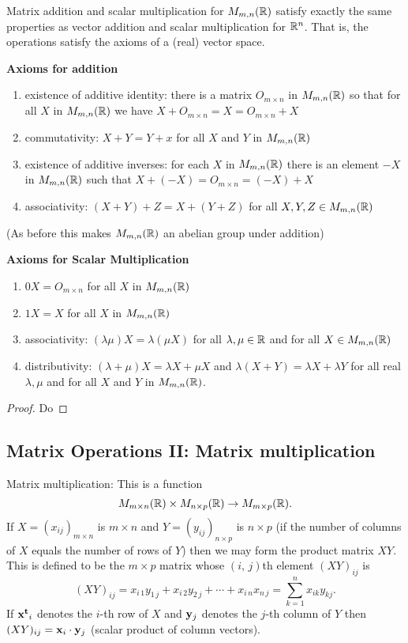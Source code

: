 \documentclass[10pt, a4paper]{article}
\begin{document}
\begin{proposition}
    Matrix addition and scalar multiplication for $M_{m, n}(\mathbb{R})$ satisfy exactly the same properties as vector addition and scalar multiplication for $\mathbb{R} ^ n$. That is, the operations satisfy the axioms of a (real) vector space.

    \textbf{Axioms for addition}
    \begin{enumerate}[label = (\roman*)]
        \item existence of additive identity: there is a matrix $O_{m \times n}$ in $M_{m, n}(\mathbb{R})$ so that for all $X$ in $M_{m, n}(\mathbb{R})$ we have $X + O_{m \times n} = X = O_{m \times n} + X$ 
        \item commutativity: $X + Y = Y + x$ for all $X$ and $Y$ in $M_{m, n}(\mathbb{R})$
        \item existence of additive inverses: for each $X$ in $M_{m, n}(\mathbb{R})$ there is an element $-X$ in $M_{m, n}(\mathbb{R})$ such that $X + (-X) = O_{m \times n} = (-X) + X$
        \item associativity: $(X + Y) + Z = X + (Y + Z)$ for all $X, Y, Z \in M_{m, n}(\mathbb{R})$
    \end{enumerate}
    (As before this makes $M_{m, n}(\mathbb{R})$ an abelian group under addition)

    \textbf{Axioms for Scalar Multiplication}
    \begin{enumerate}[label = (\roman*)]
        \item $0X = O_{m \times n}$ for all $X$ in $M_{m, n}(\mathbb{R})$
        \item $1X = X$ for all $X$ in $M_{m, n}(\mathbb{R})$
        \item associativity: $(\lambda\mu)X = \lambda(\mu X)$ for all $\lambda, \mu \in \mathbb{R}$ and for all $X \in M_{m, n}(\mathbb{R})$
        \item distributivity: $(\lambda + \mu)X = \lambda X + \mu X$ and $\lambda (X + Y) = \lambda X + \lambda Y$ for all real $\lambda, \mu$ and for all $X$ and $Y$ in $M_{m, n}(\mathbb{R})$.
    \end{enumerate}
    \begin{proof}
        Do
    \end{proof}
\end{proposition}

\subsection{Matrix Operations II: Matrix multiplication}
Matrix multiplication: This is a function
\[
M_{m \times n}(\mathbb{R}) \times M_{n \times p}(\mathbb{R}) \rightarrow M_{m \times p}(\mathbb{R}).
\]
If $X = (x_{ij})_{m \times n}$ is $m \times n$ and $Y = (y_{ij})_{n \times p}$ is $n \times p$ (if the number of columns of $X$ equals the number of rows of $Y$) then we may form the product matrix $XY$. This is defined to be the $m \times p$ matrix whose $(i,\,j)$th element $(XY)_{ij}$ is
\[
(XY)_{ij} = x_{i\,1}y_{1\,j} + x_{i\,2}y_{2\,j} + \dotsi + x_{i\,n}x_{n\,j} = \sum_{k = 1}^{n}{x_{ik}y_{kj}}.
\]
If $\mathbf{x ^ t}_{i}$ denotes the $i$-th row of $X$ and $\mathbf{y}_j$ denotes the $j$-th column of $Y$ then $(XY)_{ij} = \mathbf{x}_i \cdot \mathbf{y}_j$ (scalar product of column vectors).
\end{document}

